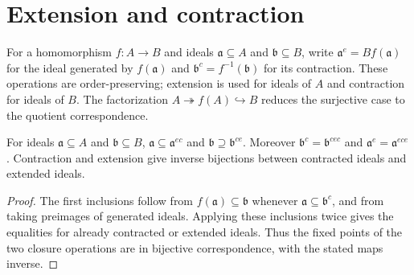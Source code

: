 \section{Extension and contraction}
\label{am-ch1-extension-contraction}

\begin{definition}
\label{am-def-extension-contraction}
\uses{}
For a homomorphism $f:A\to B$ and ideals $\mathfrak{a}\subseteq A$ and
$\mathfrak{b}\subseteq B$, write
$\mathfrak{a}^e=Bf(\mathfrak{a})$ for the ideal generated by $f(\mathfrak{a})$ and
$\mathfrak{b}^c=f^{-1}(\mathfrak{b})$ for its contraction.  These operations are
order-preserving; extension is used for ideals of $A$ and contraction for ideals
of $B$.  The factorization $A\twoheadrightarrow f(A)\hookrightarrow B$ reduces
the surjective case to the quotient correspondence.
\end{definition}

\begin{proposition}
\label{am-prop-1-17}
\uses{}
For ideals $\mathfrak{a}\subseteq A$ and $\mathfrak{b}\subseteq B$,
$\mathfrak{a}\subseteq\mathfrak{a}^{ec}$ and $\mathfrak{b}\supseteq\mathfrak{b}^{ce}$.
Moreover $\mathfrak{b}^c=\mathfrak{b}^{cec}$ and $\mathfrak{a}^e=\mathfrak{a}^{ece}$.
Contraction and extension give inverse bijections between contracted ideals and
extended ideals.
\end{proposition}
\begin{proof}
The first inclusions follow from $f(\mathfrak{a})\subseteq\mathfrak{b}$ whenever
$\mathfrak{a}\subseteq\mathfrak{b}^c$, and from taking preimages of generated ideals.
Applying these inclusions twice gives the equalities for already contracted or
extended ideals.  Thus the fixed points of the two closure operations are in
bijective correspondence, with the stated maps inverse.
\end{proof}
